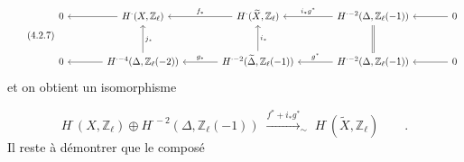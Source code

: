 \begin{equation}\tag{4.2.7}
\begin{tikzcd}[column sep=large, row sep=large]
0 & H^{\cdot}(X,\mathbb{Z}_\ell) \arrow[l] & H^{\cdot}(\widetilde{X},\mathbb{Z}_\ell) \arrow[l, "f_*"'] & H^{\cdot-2}(\Delta,\mathbb{Z}_\ell(-1)) \arrow[l, "i_*g^*"'] & 0 \arrow[l] \\
0 & H^{\cdot-4}(\Delta,\mathbb{Z}_\ell(-2)) \arrow[l] \arrow[u, "j_*"'] & H^{\cdot-2}(\widetilde{\Delta},\mathbb{Z}_\ell(-1)) \arrow[l, "g_*"'] \arrow[u, "i_*"'] & H^{\cdot-2}(\Delta,\mathbb{Z}_\ell(-1)) \arrow[l, "g^*"'] \arrow[u, equal] & 0 \arrow[l]
\end{tikzcd}
\end{equation}
et on obtient un isomorphisme

\begin{equation}\tag{4.2.8}
H^{\cdot}(X,\mathbb{Z}_\ell) \oplus H^{\cdot-2}(\Delta,\mathbb{Z}_\ell(-1)) \;\stackrel{f^*+i_*g^*}{\longrightarrow}_{\sim}\; H^{\cdot}(\widetilde{X},\mathbb{Z}_\ell) \qquad .
\end{equation}
Il reste à démontrer que le composé

